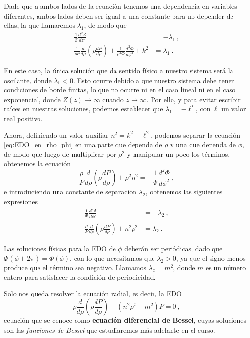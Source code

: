 Dado que a ambos lados de la ecuación tenemos una dependencia en variables diferentes, ambos lados deben ser igual a una constante para no depender de ellas, la que llamaremos $\lambda_1$, de modo que
\begin{align}
    \frac{1}{Z} \frac{d^2Z}{dz^2} & = - \lambda_1 \ , \\
    \frac{1}{\rho P} \frac{d}{d\rho} \left( \rho \frac{dP}{d\rho} \right) + \frac{1}{\rho^2 \Phi} \frac{d^2 \Phi}{d\phi^2} + k^2 & = \lambda_1 \ . \label{eq:EDO_en_rho_phi}
\end{align}

En este caso, la única solución que da sentido físico a nuestro sistema será la oscilante, donde $\lambda_1 < 0$. Esto ocurre debido a que nuestro sistema debe tener condiciones de borde finitas, lo que no ocurre ni en el caso lineal ni en el caso exponencial, donde $Z(z)  \to \infty$ cuando $z \to \infty$. Por ello, y para evitar escribir raíces en nuestras soluciones, podemos establecer que $\lambda_1 = -\ell^2$, con $\ell$ un valor real positivo. 

Ahora, definiendo un valor auxiliar $n^2 = k^2 + \ell^2$, podemos separar la ecuación \eqref{eq:EDO_en_rho_phi} en una parte que dependa de $\rho$ y una que dependa de $\phi$, de modo que luego de multiplicar por $\rho^2$ y manipular un poco los términos, obtenemos la ecuación
\begin{equation}
    \frac{\rho}{P} \frac{d}{d\rho} \left( \rho \frac{dP}{d\rho} \right) + \rho^2 n^2 = - \frac{1}{\Phi} \frac{d^2 \Phi}{d\phi^2} \ , 
\end{equation}
e introduciendo una constante de separación $\lambda_2$, obtenemos las siguientes expresiones
\begin{align}
    \frac{1}{\Phi} \frac{d^2 \Phi}{d\phi^2} & = - \lambda_2 \ , \\
    \frac{\rho}{P} \frac{d}{d\rho} \left( \rho \frac{dP}{d\rho} \right) + n^2 \rho^2 & = \lambda_2 \ .
\end{align}

Las soluciones físicas para la EDO de $\phi$ deberán ser periódicas, dado que $\Phi(\phi + 2\pi) = \Phi(\phi)$, con lo que necesitamos que $\lambda_2 > 0$, ya que el signo menos produce que el término sea negativo. Llamamos $\lambda_2 = m^2$, donde $m$ es un número entero para satisfacer la condición de periodicidad.

Solo nos queda resolver la ecuación radial, es decir, la EDO
\begin{equation}
    \rho \frac{d}{d\rho} \left( \rho \frac{dP}{d\rho} \right) + (n^2 \rho^2 - m^2)P = 0 \ ,
\end{equation}
ecuación que se conoce como \textbf{ecuación diferencial de Bessel}, cuyas soluciones son las \emph{funciones de Bessel} que estudiaremos más adelante en el curso.

